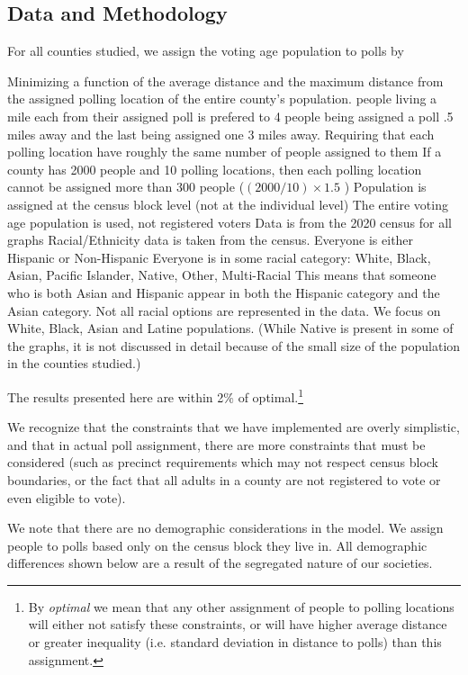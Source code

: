 \documentclass[11pt]{article}
\theoremstyle{remark}
\theoremstyle{definition}
\begin{document}
	
\subsection{Data and Methodology}
	For all counties studied, we assign the voting age population to polls by 
\begin{outline}
	\1 Minimizing a function of the average distance and the maximum distance from the assigned polling location of the entire county's population.
		 people living a mile each from their assigned poll is prefered to 4 people being assigned a poll .5 miles away and the last being assigned one 3 miles away.
	\1 Requiring that each polling location have roughly the same number of people assigned to them
		\2 If a county has 2000 people and 10 polling locations, then each polling location cannot be assigned more than 300 people ($(2000 / 10) \times 1.5$ )
	\1 Population is assigned at the census block level (not at the individual level)
		\2 The entire voting age population is used, not registered voters
		\2 Data is from the 2020 census for all graphs
		\2 Racial/Ethnicity data is taken from the census.
			\3 Everyone is either Hispanic or Non-Hispanic
			\3 Everyone is in some racial category: White, Black, Asian, Pacific Islander, Native, Other, Multi-Racial
			\3 This means that someone who is both Asian and Hispanic appear in both the Hispanic category and the Asian category.
		\2 Not all racial options are represented in the data. We focus on White, Black, Asian and Latine populations. (While Native is present in some of the graphs, it is not discussed in detail because of the small size of the population in the counties studied.)
\end{outline}

The results presented here are within 2$\%$ of optimal.\footnote{By \emph{optimal} we mean that any other assignment of people to polling locations will either not satisfy these constraints, or will have higher average distance or greater inequality (i.e. standard deviation in distance to polls) than this assignment.} 

We recognize that the constraints that we have implemented are overly simplistic, and that in actual poll assignment, there are more constraints that must be considered (such as precinct requirements which may not respect census block boundaries, or the fact that all adults in a county are not registered to vote or even eligible to vote).

We note that there are no demographic considerations in the model. We assign people to polls based only on the census block they live in. All demographic differences shown below are a result of the segregated nature of our societies.
\end{document}
